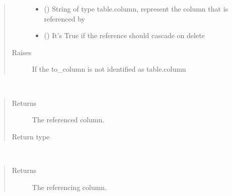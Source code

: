 \documentclass[letterpaper,10pt,english]{sphinxmanual}
\begin{document}
\begin{fulllineitems}
\begin{quote}
\begin{description}
\begin{itemize}
\item {} 
\sphinxAtStartPar
{} () \textendash{} String of type table.column, represent the column that is referenced by 

\item {} 
\sphinxAtStartPar
{} (\sphinxstyleliteralemphasis{\sphinxupquote{, }}) \textendash{} It’s True if the reference should cascade on delete

\end{itemize}

\item[{Raises}] \leavevmode
\sphinxAtStartPar
{} \textendash{} If the to\_column is not identified as table.column

\end{description}\end{quote}

\begin{fulllineitems}
\label{\detokenize{model:mini_sql.model.foreign_key.ForeignKey.get_column}}~\begin{quote}\begin{description}
\item[{Returns}] \leavevmode
\sphinxAtStartPar
The referenced column.

\item[{Return type}] \leavevmode
\sphinxAtStartPar
{\hyperref[\detokenize{model:mini_sql.model.column.Column}]{}}

\end{description}\end{quote}

\end{fulllineitems}


\begin{fulllineitems}
\label{\detokenize{model:mini_sql.model.foreign_key.ForeignKey.get_from_column}}~\begin{quote}\begin{description}
\item[{Returns}] \leavevmode
\sphinxAtStartPar
The referencing column.


\end{description}
\end{quote}
\end{fulllineitems}
\end{fulllineitems}
\end{document}
